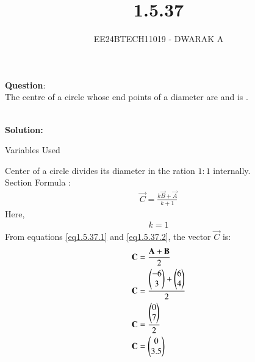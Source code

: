 \documentclass[journal]{IEEEtran}
\begin{document}

\vspace{3cm}

\title{1.5.37}
\author{EE24BTECH11019 - DWARAK A}
{\let\newpage\relax\maketitle}

\renewcommand{\thefigure}{\theenumi}
\renewcommand{\thetable}{\theenumi}
\setlength{\intextsep}{10pt} %


\renewcommand{\thetable}{\theenumi}


\textbf{Question}:
\\
The centre of a circle whose end points of a diameter are  and  is \underline{\hspace{1cm}} .

\\
\textbf{Solution: }
\begin{table}[h!]    
  \centering
  
  \caption{Variables Used}
  \label{tab1.5.37.1}
\end{table}

Center of a circle divides its diameter in the ration $1:1$ internally.\\

Section Formula :
\begin{align}
    \vec{C}=\frac{k\vec{B}+\vec{A}}{k+1}\label{eq1.5.37.1}
\end{align}
Here,
\begin{align}
    k=1\label{eq1.5.37.2}
\end{align}
From  equations \ref{eq1.5.37.1} and \ref{eq1.5.37.2}, the vector $\vec{C}$ is:
\begin{align}
    \mathbf{C}&=\frac{\mathbf{A}+\mathbf{B}}{2}\\
    \mathbf{C}&=\frac{\begin{pmatrix}-6\\3\end{pmatrix}+\begin{pmatrix}6\\4\end{pmatrix}}{2}\\
    \mathbf{C}&=\frac{\begin{pmatrix}0\\7\end{pmatrix}}{2}\\
    \mathbf{C}&=\begin{pmatrix}0\\3.5\end{pmatrix}
\end{align}
\end{document}
